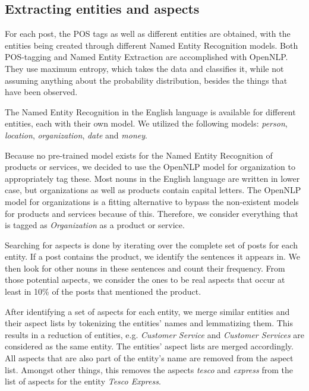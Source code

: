\documentclass[10pt,a4paper]{article}
\begin{document}
		\subsection{Extracting entities and aspects}
		\label{sec:entityextraction}
		For each post, the POS tags as well as different entities are obtained, with the entities being created through different Named Entity Recognition models. Both POS-tagging and Named Entity Extraction are accomplished with OpenNLP.
		They use maximum entropy, which takes the data and classifies it, while not assuming anything about the probability distribution, besides the things that have been observed. 
		
		The Named Entity Recognition in the English language is available for different entities, each with their own model. We utilized the following models: \textit{person}, \textit{location}, \textit{organization}, \textit{date} and \textit{money}.
		
		
		Because no pre-trained model exists for the Named Entity Recognition of products or services, we decided to use the OpenNLP model for organization to appropriately tag these. Most nouns in the English language are written in lower case, but organizations as well as products contain capital letters. The OpenNLP model for organizations is a fitting alternative to bypass the non-existent models for products and services because of this. Therefore, we consider everything that is tagged as \textit{Organization} as a product or service.
		
		
		Searching for aspects is done by iterating over the complete set of posts for each entity. If a post contains the product, we identify the sentences it appears in. We then look for other nouns in these sentences and count their frequency. From those potential aspects, we consider the ones to be real aspects that occur at least in 10\% of the posts that mentioned the product.

		After identifying a set of aspects for each entity, we merge similar entities and their aspect lists by tokenizing the entities' names and lemmatizing them. This results in a reduction of entities, e.g. \textit{Customer Service} and \textit{Customer Services} are considered as the same entity. The entities' aspect lists are merged accordingly. All aspects that are also part of the entity's name are removed from the aspect list. Amongst other things, this removes the aspects \textit{tesco} and \textit{express} from the list of aspects for the entity \textit{Tesco Express}.
\end{document}
